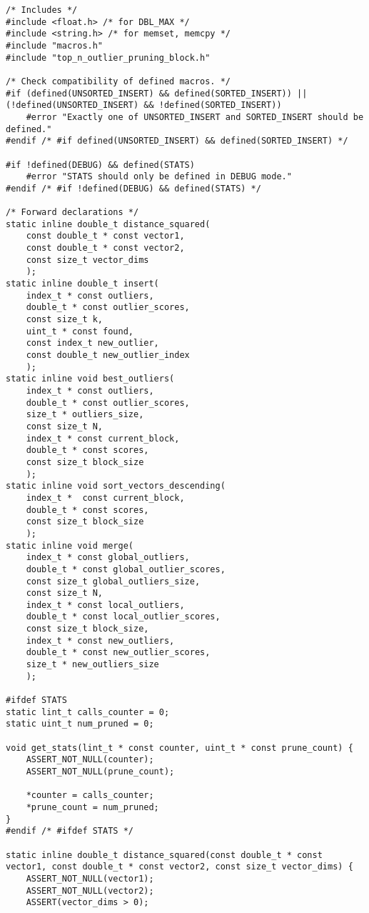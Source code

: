 \lstset{language=C}
\begin{lstlisting}
/* Includes */
#include <float.h> /* for DBL_MAX */
#include <string.h> /* for memset, memcpy */
#include "macros.h"
#include "top_n_outlier_pruning_block.h"

/* Check compatibility of defined macros. */
#if (defined(UNSORTED_INSERT) && defined(SORTED_INSERT)) || (!defined(UNSORTED_INSERT) && !defined(SORTED_INSERT))
	#error "Exactly one of UNSORTED_INSERT and SORTED_INSERT should be defined."
#endif /* #if defined(UNSORTED_INSERT) && defined(SORTED_INSERT) */

#if !defined(DEBUG) && defined(STATS)
	#error "STATS should only be defined in DEBUG mode."
#endif /* #if !defined(DEBUG) && defined(STATS) */

/* Forward declarations */
static inline double_t distance_squared(
	const double_t * const vector1, 
	const double_t * const vector2, 
	const size_t vector_dims
	);
static inline double_t insert(
	index_t * const outliers,
	double_t * const outlier_scores,
	const size_t k,
	uint_t * const found,
	const index_t new_outlier, 
	const double_t new_outlier_index
	);
static inline void best_outliers(
	index_t * const outliers,
	double_t * const outlier_scores,
	size_t * outliers_size,
	const size_t N,
	index_t * const current_block,
	double_t * const scores,
	const size_t block_size
	);
static inline void sort_vectors_descending(
	index_t *  const current_block,
	double_t * const scores,
	const size_t block_size
	);
static inline void merge(
	index_t * const global_outliers,
	double_t * const global_outlier_scores,
	const size_t global_outliers_size,
	const size_t N,
	index_t * const local_outliers,
	double_t * const local_outlier_scores,
	const size_t block_size,
	index_t * const new_outliers,
	double_t * const new_outlier_scores,
	size_t * new_outliers_size
	);

#ifdef STATS
static lint_t calls_counter = 0;
static uint_t num_pruned = 0;

void get_stats(lint_t * const counter, uint_t * const prune_count) {
	ASSERT_NOT_NULL(counter);
	ASSERT_NOT_NULL(prune_count);
	
	*counter = calls_counter;
	*prune_count = num_pruned;
}
#endif /* #ifdef STATS */

static inline double_t distance_squared(const double_t * const vector1, const double_t * const vector2, const size_t vector_dims) {
	ASSERT_NOT_NULL(vector1);
	ASSERT_NOT_NULL(vector2);
	ASSERT(vector_dims > 0);
	

\end{lstlisting}
